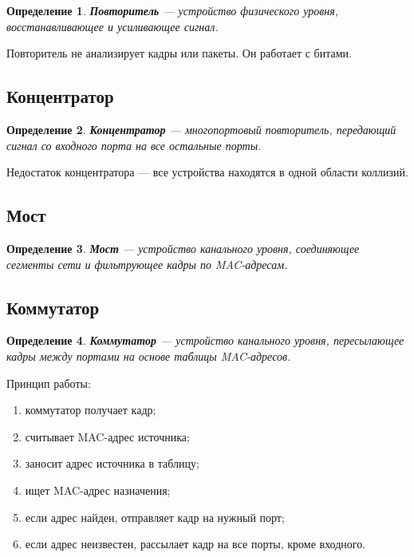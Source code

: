 \documentclass[12pt,a4paper]{article}
\newtheorem{definition}{Определение}
\begin{document}
\begin{definition}
\textbf{Повторитель} --- устройство физического уровня, восстанавливающее и усиливающее сигнал.
\end{definition}

Повторитель не анализирует кадры или пакеты. Он работает с битами.

\subsection{Концентратор}

\begin{definition}
\textbf{Концентратор} --- многопортовый повторитель, передающий сигнал со входного порта на все остальные порты.
\end{definition}

Недостаток концентратора --- все устройства находятся в одной области коллизий.

\subsection{Мост}

\begin{definition}
\textbf{Мост} --- устройство канального уровня, соединяющее сегменты сети и фильтрующее кадры по MAC-адресам.
\end{definition}

\subsection{Коммутатор}

\begin{definition}
\textbf{Коммутатор} --- устройство канального уровня, пересылающее кадры между портами на основе таблицы MAC-адресов.
\end{definition}

Принцип работы:
\begin{enumerate}
    \item коммутатор получает кадр;
    \item считывает MAC-адрес источника;
    \item заносит адрес источника в таблицу;
    \item ищет MAC-адрес назначения;
    \item если адрес найден, отправляет кадр на нужный порт;
    \item если адрес неизвестен, рассылает кадр на все порты, кроме входного.
\end{enumerate}
\end{document}
